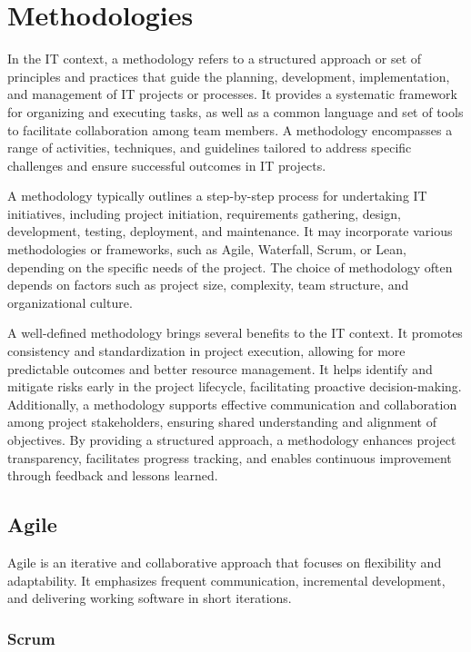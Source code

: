 \chapter{Methodologies}

In the IT context, a methodology refers to a structured approach or set of principles and practices that guide the planning, development, implementation, and management of IT projects or processes. It provides a systematic framework for organizing and executing tasks, as well as a common language and set of tools to facilitate collaboration among team members. A methodology encompasses a range of activities, techniques, and guidelines tailored to address specific challenges and ensure successful outcomes in IT projects.

A methodology typically outlines a step-by-step process for undertaking IT initiatives, including project initiation, requirements gathering, design, development, testing, deployment, and maintenance. It may incorporate various methodologies or frameworks, such as Agile, Waterfall, Scrum, or Lean, depending on the specific needs of the project. The choice of methodology often depends on factors such as project size, complexity, team structure, and organizational culture.

A well-defined methodology brings several benefits to the IT context. It promotes consistency and standardization in project execution, allowing for more predictable outcomes and better resource management. It helps identify and mitigate risks early in the project lifecycle, facilitating proactive decision-making. Additionally, a methodology supports effective communication and collaboration among project stakeholders, ensuring shared understanding and alignment of objectives. By providing a structured approach, a methodology enhances project transparency, facilitates progress tracking, and enables continuous improvement through feedback and lessons learned.

\section{Agile}

Agile is an iterative and collaborative approach that focuses on flexibility and adaptability. It emphasizes frequent communication, incremental development, and delivering working software in short iterations.

\subsection{Scrum}

